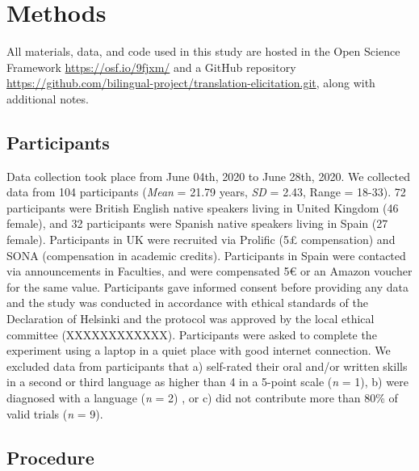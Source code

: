 \documentclass[
  english,
  man,floatsintext]{apa6}
\begin{document}
\hypertarget{methods}{%
\section{Methods}\label{methods}}

All materials, data, and code used in this study are hosted in the Open Science Framework \url{https://osf.io/9fjxm/} and a GitHub repository \url{https://github.com/bilingual-project/translation-elicitation.git}, along with additional notes.

\hypertarget{participants}{%
\subsection{Participants}\label{participants}}

Data collection took place from June 04th, 2020 to June 28th, 2020. We collected data from 104 participants (\emph{Mean} = 21.79 years, \emph{SD} = 2.43, Range = 18-33). 72 participants were British English native speakers living in United Kingdom (46 female), and 32 participants were Spanish native speakers living in Spain (27 female). Participants in UK were recruited via Prolific (5£ compensation) and SONA (compensation in academic credits). Participants in Spain were contacted via announcements in Faculties, and were compensated 5€ or an Amazon voucher for the same value. Participants gave informed consent before providing any data and the study was conducted in accordance with ethical standards of the Declaration of Helsinki and the protocol was approved by the local ethical committee (XXXXXXXXXXXX). Participants were asked to complete the experiment using a laptop in a quiet place with good internet connection. We excluded data from participants that a) self-rated their oral and/or written skills in a second or third language as higher than 4 in a 5-point scale (\emph{n} = 1), b) were diagnosed with a language (\emph{n} = 2) , or c) did not contribute more than 80\% of valid trials (\emph{n} = 9).

\hypertarget{procedure}{%
\subsection{Procedure}\label{procedure}}
\end{document}
